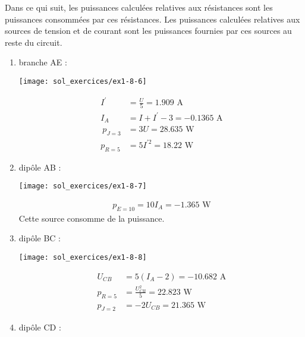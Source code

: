 
Dans ce qui suit, les puissances calculées relatives aux résistances
sont les puissances consommées par ces résistances. Les puissances calculées
relatives aux sources de tension et de courant sont les puissances
fournies par ces sources au reste du circuit.

\begin{enumerate}
	\item branche AE :
	
	\begin{minipage}[c]{5cm}
		\begin{center}
			\texttt{[image: sol\_exercices/ex1-8-6]}
		\end{center}
	\end{minipage}
	\begin{minipage}[c]{5cm}
		\begin{align*}
		I^{'}&=\frac{U}{5}=1.909\,\, \text{A}\\
		I_A&=I+I^{'}-3=-0.1365\,\, \text{A}\\\
		p_{J=3}&=3U=28.635\, \, \text{W}\\
		p_{R=5}&=5I^{'2}=18.22 \,\, \text{W}
		\end{align*}
	\end{minipage}
	\item dipôle AB :
	
	\begin{minipage}[c]{5cm}
		\begin{center}
			\texttt{[image: sol\_exercices/ex1-8-7]}
		\end{center}
	\end{minipage}
	\begin{minipage}[c]{5cm}
		\begin{align*}
		p_{E=10}=10I_A = -1.365\, \, \text{W}
		\end{align*}
		Cette source consomme de la puissance.
	\end{minipage}
	\item dipôle BC :
	
	\begin{minipage}[c]{5cm}
		\begin{center}
			\texttt{[image: sol\_exercices/ex1-8-8]}
		\end{center}
	\end{minipage}
	\begin{minipage}[c]{5cm}
		\begin{align*}
		U_{CB}&=5(I_A-2)= -10.682\, \, \text{A}\\
		p_{R=5}&=\frac{U_{CB}^2}{5}=22.823\, \, \text{W}\\
		p_{J=2}&=-2U_{CB}=21.365\, \, \text{W}
		\end{align*}
	\end{minipage}
	\item dipôle CD :
	

\end{enumerate}
